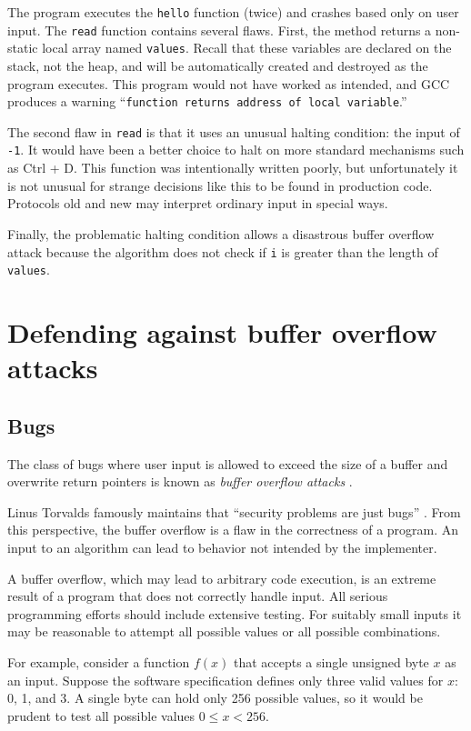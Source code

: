 \documentclass{book}
\begin{document}
The program executes the \texttt{hello} function (twice) and crashes based only on user input. The \texttt{read} function contains several flaws. First, the method returns a non-static local array named \texttt{values}. Recall that these variables are declared on the stack, not the heap, and will be automatically created and destroyed as the program executes. This program would not have worked as intended, and GCC produces a warning ``\texttt{function returns address of local variable}.''

The second flaw in \texttt{read} is that it uses an unusual halting condition: the input of \texttt{-1}. It would have been a better choice to halt on more standard mechanisms such as Ctrl + D. This function was intentionally written poorly, but unfortunately it is not unusual for strange decisions like this to be found in production code. Protocols old and new may interpret ordinary input in special ways.

Finally, the problematic halting condition allows a disastrous buffer overflow attack because the algorithm does not check if \texttt{i} is greater than the length of \texttt{values}.

\section{Defending against buffer overflow attacks}

\subsection{Bugs}
The class of bugs where user input is allowed to exceed the size of a buffer and overwrite return pointers is known as \textit{buffer overflow attacks} \cite{Erickson:2008:HAE:1407147}.

Linus Torvalds famously maintains that ``security problems are just bugs'' \cite{torvalds_2017}. From this perspective, the buffer overflow is a flaw in the correctness of a program. An input to an algorithm can lead to behavior not intended by the implementer.

A buffer overflow, which may lead to arbitrary code execution, is an extreme result of a program that does not correctly handle input. All serious programming efforts should include extensive testing. For suitably small inputs it may be reasonable to attempt all possible values or all possible combinations.

For example, consider a function $f(x)$ that accepts a single unsigned byte $x$ as an input. Suppose the software specification defines only three valid values for $x$: 0, 1, and 3. A single byte can hold only 256 possible values, so it would be prudent to test all possible values $0 \le x < 256$.
\end{document}
